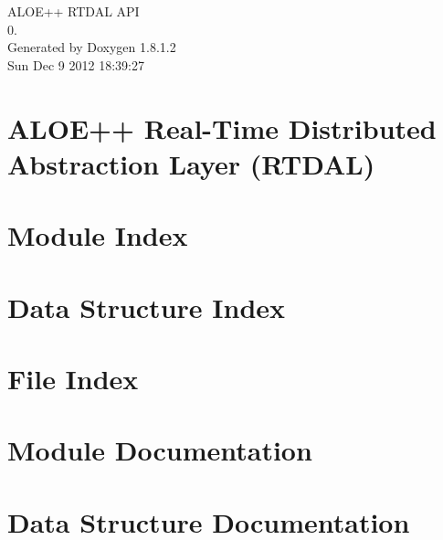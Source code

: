 \documentclass{book}
\begin{document}
\hypersetup{pageanchor=false,citecolor=blue}
\begin{titlepage}
\vspace*{7cm}
\begin{center}
{\Large A\-L\-O\-E++ R\-T\-D\-A\-L A\-P\-I \\[1ex]\large 0. }\\
\vspace*{1cm}
{\large Generated by Doxygen 1.8.1.2}\\
\vspace*{0.5cm}
{\small Sun Dec 9 2012 18:39:27}\\
\end{center}
\end{titlepage}
\clearemptydoublepage
{}
\tableofcontents
\clearemptydoublepage
{}
\hypersetup{pageanchor=true,citecolor=blue}
\chapter{A\-L\-O\-E++ Real-\/\-Time Distributed Abstraction Layer (R\-T\-D\-A\-L)}
\label{index}\hypertarget{index}{}
\chapter{Module Index}

\chapter{Data Structure Index}

\chapter{File Index}

\chapter{Module Documentation}










\chapter{Data Structure Documentation}



















\end{document}
